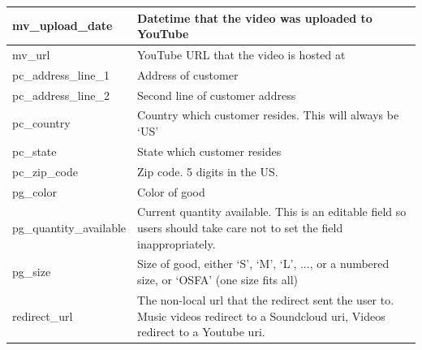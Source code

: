 \documentclass[11pt, a4paper]{report}
\begin{document}
\begin{longtable}{|l|p{10cm}|}
mv\_upload\_date        & Datetime that the video was uploaded to YouTube                                                                                                                      \\ \hline
mv\_url                 & YouTube URL that the video is hosted at                                                                                                                               \\ \hline
pc\_address\_line\_1    & Address of customer                                                                                                                                                   \\ \hline
pc\_address\_line\_2    & Second line of customer address                                                                                                                                       \\ \hline
pc\_country             & Country which customer resides. This will always be `US'                                                                                                              \\ \hline
pc\_state               & State which customer resides                                                                                                                                          \\ \hline
pc\_zip\_code           & Zip code. 5 digits in the US.                                                                                                                                         \\ \hline
pg\_color               & Color of good                                                                                                                                                         \\ \hline
pg\_quantity\_available & Current quantity available. This is an editable field so users should take care not to set the field inappropriately.                                                 \\ \hline
pg\_size                & Size of good, either `S', `M', `L', ..., or a numbered size, or `OSFA' (one size fits all)                                                                            \\ \hline
redirect\_url           & The non-local url that the redirect sent the user to. Music videos redirect to a Soundcloud uri, Videos redirect to a Youtube uri.                                    \\ \hline

\end{longtable}
\end{document}
